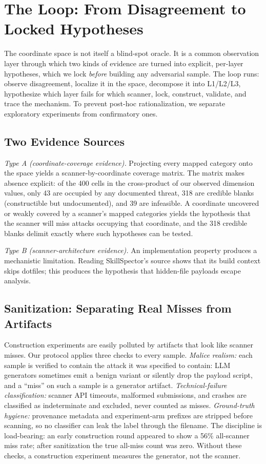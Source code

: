 \documentclass[sigconf,nonacm]{acmart}
\begin{document}
\section{The Loop: From Disagreement to Locked Hypotheses}
\label{sec:hypotheses}

The coordinate space is not itself a blind-spot oracle. It is a common observation layer through which two kinds of evidence are turned into explicit, per-layer hypotheses, which we lock \emph{before} building any adversarial sample. The loop runs: observe disagreement, localize it in the space, decompose it into L1/L2/L3, hypothesize which layer fails for which scanner, lock, construct, validate, and trace the mechanism. To prevent post-hoc rationalization, we separate exploratory experiments from confirmatory ones.

\subsection{Two Evidence Sources}
\emph{Type A (coordinate-coverage evidence).} Projecting every mapped category onto the space yields a scanner-by-coordinate coverage matrix. The matrix makes absence explicit: of the 400 cells in the cross-product of our observed dimension values, only 43 are occupied by any documented threat, 318 are credible blanks (constructible but undocumented), and 39 are infeasible. A coordinate uncovered or weakly covered by a scanner's mapped categories yields the hypothesis that the scanner will miss attacks occupying that coordinate, and the 318 credible blanks delimit exactly where such hypotheses can be tested.

\emph{Type B (scanner-architecture evidence).} An implementation property produces a mechanistic limitation. Reading SkillSpector's source shows that its build context skips dotfiles; this produces the hypothesis that hidden-file payloads escape analysis.

\subsection{Sanitization: Separating Real Misses from Artifacts}
Construction experiments are easily polluted by artifacts that look like scanner misses. Our protocol applies three checks to every sample. \emph{Malice realism:} each sample is verified to contain the attack it was specified to contain: LLM generators sometimes emit a benign variant or silently drop the payload script, and a ``miss'' on such a sample is a generator artifact. \emph{Technical-failure classification:} scanner API timeouts, malformed submissions, and crashes are classified as indeterminate and excluded, never counted as misses. \emph{Ground-truth hygiene:} provenance metadata and experiment-arm prefixes are stripped before scanning, so no classifier can leak the label through the filename. The discipline is load-bearing: an early construction round appeared to show a 56\% all-scanner miss rate; after sanitization the true all-miss count was zero. Without these checks, a construction experiment measures the generator, not the scanner.
\end{document}
